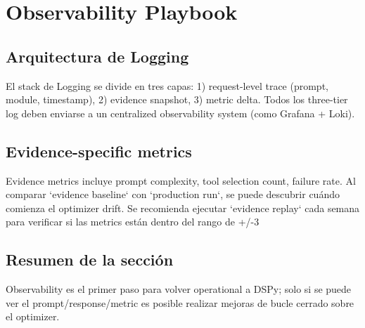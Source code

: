\section{Observability Playbook}

\subsection{Arquitectura de Logging}

El stack de Logging se divide en tres capas: 1) request-level trace (prompt, module, timestamp), 2) evidence snapshot, 3) metric delta. Todos los three-tier log deben enviarse a un centralized observability system (como Grafana + Loki).

\subsection{Evidence-specific metrics}

Evidence metrics incluye prompt complexity, tool selection count, failure rate. Al comparar `evidence baseline` con `production run`, se puede descubrir cuándo comienza el optimizer drift. Se recomienda ejecutar `evidence replay` cada semana para verificar si las metrics están dentro del rango de +/-3%

\subsection{Resumen de la sección}

Observability es el primer paso para volver operational a DSPy; solo si se puede ver el prompt/response/metric es posible realizar mejoras de bucle cerrado sobre el optimizer.

